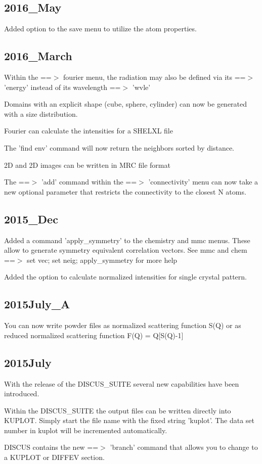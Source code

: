\subsection*{2016\_May}
\par
Added option to the save menu to utilize the atom properties. 
\subsection*{2016\_March}
\par
Within the ==$> $ fourier menu, the radiation may also be defined 
via its ==$> $ 'energy' instead of its wavelength ==$> $ 'wvle' 
\par
Domains with an explicit shape (cube, sphere, cylinder) can now 
be generated with a size distribution. 
\par
Fourier can calculate the intensities for a SHELXL file 
\par
The 'find env' command will now return the neighbors sorted by distance. 
\par
2D and 2D images can be written in MRC file format 
\par
The ==$> $ 'add' command within the ==$> $ 'connectivity' menu can now take 
a new optional parameter that restricts the connectivity to the 
closest N atoms. 
\subsection*{2015\_Dec}
\par
Added a command 'apply\_symmetry' to the chemistry and mmc menus. 
These allow to generate symmetry equivalent correlation vectors. 
See mmc and chem ==$> $ set vec; set neig; apply\_symmetry for more help 
\par
Added the option to calculate normalized intensities for single 
crystal pattern. 
\subsection*{2015July\_A}
\par
You can now write powder files as normalized scattering function S(Q) 
or as reduced normalized scattering function F(Q) = Q[S(Q)-1] 
\par
\subsection*{2015July}
\par
With the release of the DISCUS\_SUITE several new capabilities have 
been introduced. 
\par
Within the DISCUS\_SUITE the output files can be written directly into 
KUPLOT. Simply start the file name with the fixed string 'kuplot'. 
The data set number in kuplot will be incremented automatically. 
\par
DISCUS contains the new ==$> $ 'branch' command that allows you to 
change to a KUPLOT or DIFFEV section. 
